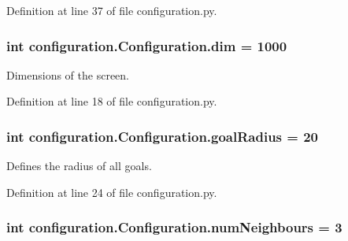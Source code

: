 Definition at line 37 of file configuration.\-py.

\hypertarget{classconfiguration_1_1Configuration_af63a65a65716f36cb11afd4d0e7f318f}{
\subsubsection[{dim}]{\setlength{\rightskip}{0pt plus 5cm}int configuration.\-Configuration.\-dim = 1000\hspace{0.3cm}{\ttfamily [static]}}}\label{classconfiguration_1_1Configuration_af63a65a65716f36cb11afd4d0e7f318f}


Dimensions of the screen. 



Definition at line 18 of file configuration.\-py.

\hypertarget{classconfiguration_1_1Configuration_a1a5fee18f20950a467d1b94d4d276c78}{
\subsubsection[{goal\-Radius}]{\setlength{\rightskip}{0pt plus 5cm}int configuration.\-Configuration.\-goal\-Radius = 20\hspace{0.3cm}{\ttfamily [static]}}}\label{classconfiguration_1_1Configuration_a1a5fee18f20950a467d1b94d4d276c78}


Defines the radius of all goals. 



Definition at line 24 of file configuration.\-py.

\hypertarget{classconfiguration_1_1Configuration_a7eef6f8f2eb6d4a8fa4a45ddf9f6e1ba}{
\subsubsection[{num\-Neighbours}]{\setlength{\rightskip}{0pt plus 5cm}int configuration.\-Configuration.\-num\-Neighbours = 3\hspace{0.3cm}{\ttfamily [static]}}}\label{classconfiguration_1_1Configuration_a7eef6f8f2eb6d4a8fa4a45ddf9f6e1ba}


